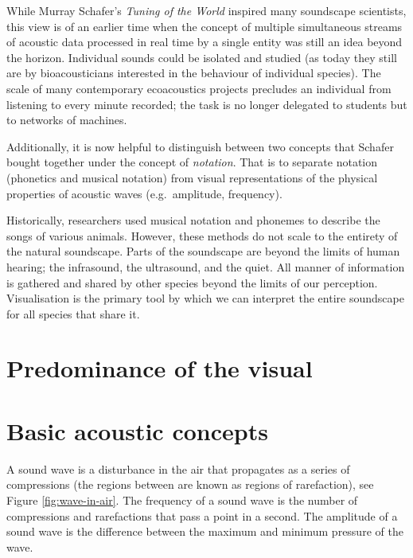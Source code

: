 \documentclass[
]{book}
\begin{document}
While Murray Schafer's \emph{Tuning of the World} \citep{schafer1977} inspired many soundscape scientists, this view is of an earlier time when the concept of multiple simultaneous streams of acoustic data processed in real time by a single entity was still an idea beyond the horizon. Individual sounds could be isolated and studied (as today they still are by bioacousticians interested in the behaviour of individual species). The scale of many contemporary ecoacoustics projects precludes an individual from listening to every minute recorded; the task is no longer delegated to students but to networks of machines.

Additionally, it is now helpful to distinguish between two concepts that Schafer bought together under the concept of \emph{notation}. That is to separate notation (phonetics and musical notation) from visual representations of the physical properties of acoustic waves (e.g.~amplitude, frequency).

Historically, researchers used musical notation and phonemes to describe the songs of various animals. However, these methods do not scale to the entirety of the natural soundscape. Parts of the soundscape are beyond the limits of human hearing; the infrasound, the ultrasound, and the quiet. All manner of information is gathered and shared by other species beyond the limits of our perception. Visualisation is the primary tool by which we can interpret the entire soundscape for all species that share it.

\hypertarget{predominance-of-the-visual}{%
\section{Predominance of the visual}\label{predominance-of-the-visual}}

\hypertarget{basic-acoustic-concepts}{%
\section{Basic acoustic concepts}\label{basic-acoustic-concepts}}

A sound wave is a disturbance in the air that propagates as a series of compressions (the regions between are known as regions of rarefaction), see Figure \ref{fig:wave-in-air}. The frequency of a sound wave is the number of compressions and rarefactions that pass a point in a second. The amplitude of a sound wave is the difference between the maximum and minimum pressure of the wave.
\end{document}
